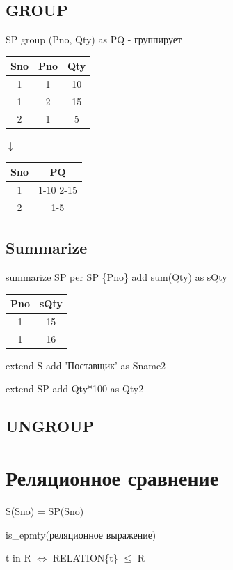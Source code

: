 \documentclass[a4paper, 14pt]{report}
\begin{document}
\subsection{GROUP}

SP group (Pno, Qty) as PQ - группирует

\begin{tabular}{|c|c|c|}
    \hline
    Sno & Pno & Qty \\
    \hline
    1 & 1 & 10 \\
    \hline
    1 & 2 & 15 \\
    \hline
    2 & 1 & 5 \\
    \hline
\end{tabular}

$\downarrow$

\begin{tabular}{|c|c|}
    \hline
    Sno & PQ \\
    \hline
    1 & 1-10 2-15 \\
    \hline
    2 & 1-5 \\
    \hline
\end{tabular}

\subsection{Summarize}

summarize SP per SP \{Pno\} add sum(Qty) as sQty

\begin{tabular}{|c|c|}
    \hline
    Pno & sQty \\
    \hline
    1 & 15 \\
    \hline
    1 & 16 \\
    \hline
\end{tabular}

extend S add 'Поставщик' as Sname2

extend SP add Qty*100 as Qty2

\subsection{UNGROUP}

\section{Реляционное сравнение}

S(Sno) = SP(Sno)

is\_epmty(реляционное выражение)

t in R $\Leftrightarrow$ RELATION\{t\} $\le$ R
\end{document}
